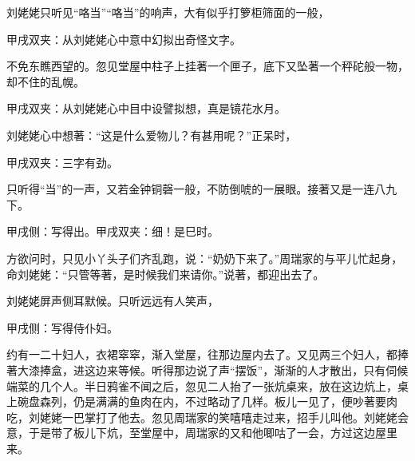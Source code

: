\begin{parag}
    刘姥姥只听见“咯当”“咯当”的响声，大有似乎打箩柜筛面的一般，\begin{note}甲戌双夹：从刘姥姥心中意中幻拟出奇怪文字。\end{note}不免东瞧西望的。忽见堂屋中柱子上挂著一个匣子，底下又坠著一个秤砣般一物，却不住的乱幌。\begin{note}甲戌双夹：从刘姥姥心中目中设譬拟想，真是镜花水月。\end{note}刘姥姥心中想著：“这是什么爱物儿？有甚用呢？”正呆时，\begin{note}甲戌双夹：三字有劲。\end{note}只听得“当”的一声，又若金钟铜磬一般，不防倒唬的一展眼。接著又是一连八九下。\begin{note}甲戌侧：写得出。甲戌双夹：细！是巳时。\end{note}方欲问时，只见小丫头子们齐乱跑，说：“奶奶下来了。”周瑞家的与平儿忙起身，命刘姥姥：“只管等著，是时候我们来请你。”说著，都迎出去了。
\end{parag}


\begin{parag}
    刘姥姥屏声侧耳默候。只听远远有人笑声，\begin{note}甲戌侧：写得侍仆妇。\end{note}约有一二十妇人，衣裙窣窣，渐入堂屋，往那边屋内去了。又见两三个妇人，都捧著大漆捧盒，进这边来等候。听得那边说了声“摆饭”，渐渐的人才散出，只有伺候端菜的几个人。半日鸦雀不闻之后，忽见二人抬了一张炕桌来，放在这边炕上，桌上碗盘森列，仍是满满的鱼肉在内，不过略动了几样。板儿一见了，便吵著要肉吃，刘姥姥一巴掌打了他去。忽见周瑞家的笑嘻嘻走过来，招手儿叫他。刘姥姥会意，于是带了板儿下炕，至堂屋中，周瑞家的又和他唧咕了一会，方过这边屋里来。
\end{parag}


